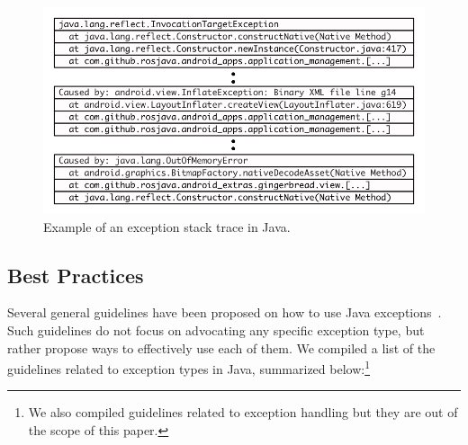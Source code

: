 \documentclass[conference]{IEEEtran}
\begin{document}
\begin{figure} \centering \includegraphics[scale=0.6]{stacktrace_bw.png}
\caption{Example of an exception stack trace in Java.}
\label{fig:wrapping}
\end{figure}



\subsection{Best Practices}
\label{sec:best}

Several general guidelines have been proposed on how to use Java
exceptions~\cite{mandrioli1992advances,gosling2000java,wirfs2006toward,
bloch2008effective}. Such guidelines do not focus on 
advocating any specific exception type, but rather propose ways to effectively use each of them.
 We compiled a list of the guidelines related to exception types in Java, 
summarized below:\footnote{We also compiled guidelines related
to exception handling but they are out of the scope of this paper.}

\end{document}
